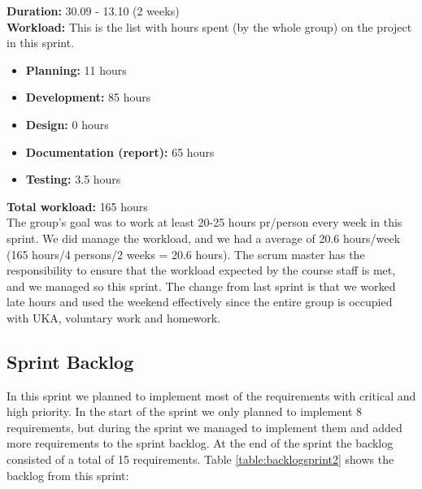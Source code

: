 	{\bf Duration:} 30.09 - 13.10 (2 weeks)\\
	{\bf Workload:} This is the list with hours spent (by the whole group) on the project in this sprint.
	\begin{itemize}
		\item {\bf Planning:} 11 hours
		\item {\bf Development:} 85 hours
		\item {\bf Design:} 0 hours
		\item {\bf Documentation (report):} 65 hours
		\item {\bf Testing:} 3.5 hours
	\end{itemize}
	{\bf Total workload: } 165 hours \\

	The group's goal was to work at least 20-25 hours pr/person every week in this sprint. 
	We did manage the workload, and we had a average of 20.6 hours/week (165 hours/4 persons/2 weeks = 20.6 hours). 
	The scrum master has the responsibility to ensure that the workload expected by the course staff is 
	met, and we managed so this sprint. The change from last sprint is that we worked late hours and used 
	the weekend effectively since the entire group is occupied with UKA, voluntary work and homework.

\subsection{Sprint Backlog}

	In this sprint we planned to implement most of the requirements with critical and high
	priority. In the start of the sprint we only planned to implement 8 requirements, but
	during the sprint we managed to implement them and added more requirements to the sprint backlog.
	At the end of the sprint the backlog consisted of a total of 15 requirements. Table \ref{table:backlogsprint2} shows the backlog from this sprint:

